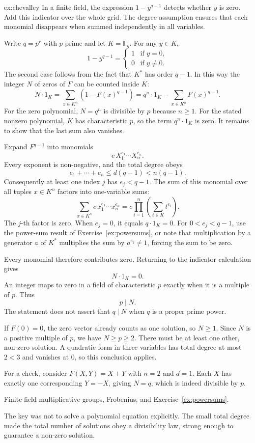 \begin{solution}{ex:chevalley}
\idea In a finite field, the expression $1-y^{q-1}$ detects whether $y$ is zero. Add this indicator over the whole grid. The degree assumption ensures that each monomial disappears when summed independently in all variables.

\writeup Write $q=p^r$ with $p$ prime and let $K=\mathbb F_q$. For any $y\in K$,
\[
1-y^{q-1}=\begin{cases}1&\text{if }y=0,\\0&\text{if }y\ne0.\end{cases}
\]
The second case follows from the fact that $K^*$ has order $q-1$. In this way the integer $N$ of zeros of $F$ can be counted inside $K$:
\[
N\cdot1_K=\sum_{x\in K^n}(1-F(x)^{q-1})
=q^n\cdot1_K-\sum_{x\in K^n}F(x)^{q-1}.
\]
For the zero polynomial, $N=q^n$ is divisible by $p$ because $n\ge1$.
For the stated nonzero polynomial, $K$ has characteristic $p$, so the term
$q^n\cdot1_K$ is zero. It remains to show that the last sum also vanishes.

Expand $F^{q-1}$ into monomials
\[
c\,X_1^{e_1}\cdots X_n^{e_n}.
\]
Every exponent is non-negative, and the total degree obeys
\[
e_1+\cdots+e_n\le d(q-1)<n(q-1).
\]
Consequently at least one index $j$ has $e_j<q-1$. The sum of this monomial over all tuples $x\in K^n$ factors into one-variable sums:
\[
\sum_{x\in K^n}c\,x_1^{e_1}\cdots x_n^{e_n}
=c\prod_{i=1}^n\left(\sum_{t\in K}t^{e_i}\right).
\]
The $j$-th factor is zero. When $e_j=0$, it equals $q\cdot1_K=0$. For $0<e_j<q-1$, use the power-sum result of Exercise~\ref{ex:powersums}, or note that multiplication by a generator $a$ of $K^*$ multiplies the sum by $a^{e_j}\ne1$, forcing the sum to be zero.

Every monomial therefore contributes zero. Returning to the indicator calculation gives
\[
N\cdot1_K=0.
\]
An integer maps to zero in a field of characteristic $p$ exactly when it is a multiple of $p$. Thus
\[
\boxed{p\mid N}.
\]
The statement does not assert that $q\mid N$ when $q$ is a proper prime power.

If $F(0)=0$, the zero vector already counts as one solution, so $N\ge1$. Since $N$ is a positive multiple of $p$, we have $N\ge p\ge2$. There must be at least one other, non-zero solution. A quadratic form in three variables has total degree at most $2<3$ and vanishes at $0$, so this conclusion applies.

For a check, consider $F(X,Y)=X+Y$ with $n=2$ and $d=1$. Each $X$ has exactly one corresponding $Y=-X$, giving $N=q$, which is indeed divisible by $p$.

\tools Finite-field multiplicative groups, Frobenius, and Exercise~\ref{ex:powersums}.

\leads The key was not to solve a polynomial equation explicitly. The small total degree made the total number of solutions obey a divisibility law, strong enough to guarantee a non-zero solution.
\end{solution}

